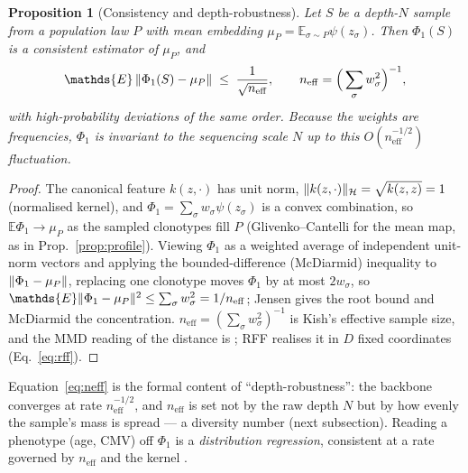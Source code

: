 \documentclass[11pt]{article}
\theoremstyle{oldplain}
\newtheorem{proposition}{Proposition}
\theoremstyle{oldrem}
\newcommand{\E}{\mathds{E}}
\DeclarePairedDelimiter{\norm}{\lVert}{\rVert}
\begin{document}
\begin{proposition}[Consistency and depth-robustness]\label{prop:kme}
Let $S$ be a depth-$N$ sample from a population law $P$ with mean embedding
$\mu_P=\E_{\sigma\sim P}\psi(z_\sigma)$. Then $\Phi_1(S)$ is a consistent estimator of $\mu_P$, and
\begin{equation}\label{eq:neff}
  \E\,\norm{\Phi_1(S)-\mu_P}\;\le\;\frac{1}{\sqrt{n_{\mathrm{eff}}}},\qquad
  n_{\mathrm{eff}}=\Big(\sum_\sigma w_\sigma^2\Big)^{-1},
\end{equation}
with high-probability deviations of the same order. Because the weights are frequencies, $\Phi_1$ is invariant to
the sequencing scale $N$ up to this $O(n_{\mathrm{eff}}^{-1/2})$ fluctuation.
\end{proposition}
\begin{proof}
The canonical feature $k(z,\cdot)$ has unit norm, $\norm{k(z,\cdot)}_{\mathcal H}=\sqrt{k(z,z)}=1$ (normalised
kernel), and $\Phi_1=\sum_\sigma w_\sigma\psi(z_\sigma)$ is a convex combination, so $\E\Phi_1\to\mu_P$ as the
sampled clonotypes fill $P$ (Glivenko--Cantelli for the mean map, as in Prop.~\ref{prop:profile}). Viewing
$\Phi_1$ as a weighted average of independent unit-norm vectors and applying the bounded-difference (McDiarmid)
inequality to $\norm{\Phi_1-\mu_P}$, replacing one clonotype moves $\Phi_1$ by at most $2w_\sigma$, so
$\E\norm{\Phi_1-\mu_P}^2\le\sum_\sigma w_\sigma^2=1/n_{\mathrm{eff}}$; Jensen gives the root bound and McDiarmid
the concentration. $n_{\mathrm{eff}}=(\sum_\sigma w_\sigma^2)^{-1}$ is Kish's effective sample size, and the
{\scshape MMD} reading of the distance is \cite{Gretton2012}; {\scshape RFF} realises it in $D$ fixed coordinates
(Eq.~\eqref{eq:rff}). \end{proof}

Equation~\eqref{eq:neff} is the formal content of ``depth-robustness'': the backbone converges at rate
$n_{\mathrm{eff}}^{-1/2}$, and $n_{\mathrm{eff}}$ is set not by the raw depth $N$ but by how evenly the sample's
mass is spread --- a diversity number (next subsection). Reading a phenotype (age, {\scshape CMV}) off $\Phi_1$ is
a \emph{distribution regression}, consistent at a rate governed by $n_{\mathrm{eff}}$ and the kernel
\cite{Szabo2016,Muandet2017}.
\end{document}
